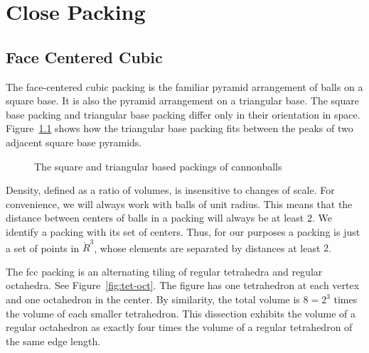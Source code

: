 


\chapter{Close Packing}
\section{Face Centered Cubic}



The face-centered cubic packing is the familiar pyramid arrangement
of balls on a square base.  It is also the pyramid arrangement on 
a triangular base.  The square base packing and triangular base
packing differ only in their orientation in space.  
Figure~\ref{fig:tri-square-cannonballs} 
shows how the triangular base packing fits between the peaks
of two adjacent square base pyramids.

\begin{figure}[htb]
  \centering
  \caption{The square and triangular based packings of cannonballs}
  \label{fig:tri-square-cannonballs}
\end{figure}

Density, defined as a ratio of volumes, is insensitive to changes
of scale.  For convenience, we will always work with balls of unit radius.
This means that the distance between centers of balls in a packing
will always be at least $2$.  We identify a packing with
its set of centers.  Thus, for our purposes a packing is just
a set of points in $\ring{R}^3$, whose elements are separated by
distances at least $2$.


The fcc packing is an alternating tiling of regular
tetrahedra and regular octahedra.  See Figure~\ref{fig:tet-oct}.
The figure has one
tetrahedron at each vertex and one octahedron in the center.
By similarity, the total volume is $8 = 2^3$ times the volume of each
smaller tetrahedron.
This dissection exhibits
the volume of a regular octahedron as exactly four times
the volume of a regular tetrahedron of the same edge length.

